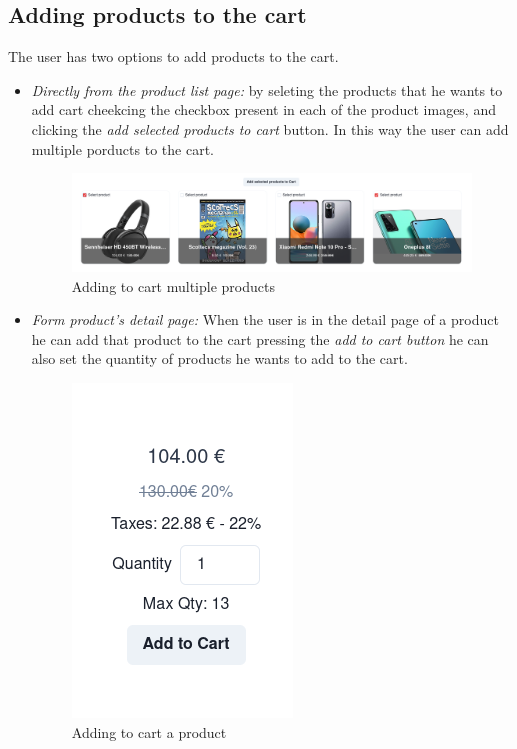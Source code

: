 \subsection{Adding products to the cart}
The user has two options to add products to the cart.
\begin{itemize}
    \item \textit{Directly from the product list page:} by seleting the products that he wants to add cart cheekcing the checkbox present in each of the product images, and clicking the \textit{add selected products to cart} button. In this way the user can add multiple porducts to the cart.
          \begin{figure}[!ht]
              \caption{Adding to cart multiple products}
              \vspace{10px}
              \includegraphics[scale=0.25]{../../../../Images/userManual/addtoCartPLP.png}
              \centering
          \end{figure}
    \item \textit{Form product's detail page:} When the user is in the detail page of a product he can add that product to the cart pressing the \textit{add to cart button} he can also set the quantity of products he wants to add to the cart.
          \begin{figure}[!ht]
              \caption{Adding to cart a product}
              \vspace{10px}
              \includegraphics[scale=0.5]{../../../../Images/userManual/addtoCartPDP.png}
              \centering
          \end{figure}
\end{itemize}
